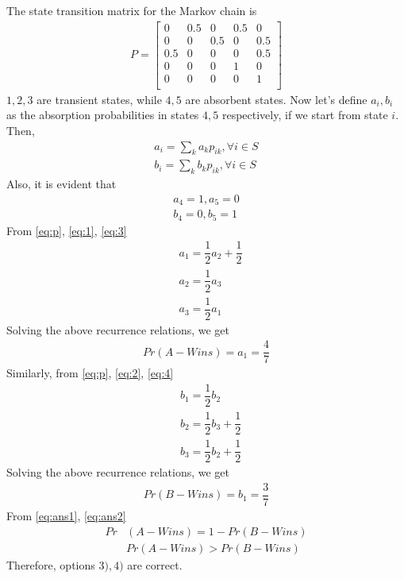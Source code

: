 \documentclass[journal,12pt,twocolumn]{IEEEtran}
\begin{document}
The state transition matrix for the Markov chain is
\begin{align}
\tag{104.2}
\label{eq:p}
    P=\begin{bmatrix}
0 & 0.5 & 0 & 0.5 & 0 \\
0 & 0 & 0.5 & 0 & 0.5 \\
0.5 & 0 & 0 & 0 & 0.5 \\
0 & 0 & 0 & 1 & 0 \\
0 & 0 & 0 & 0 & 1 \\
\end{bmatrix}
\end{align}
$1,2,3$ are transient states, while $4,5$ are absorbent states. Now let's define $a_{i},b_{i}$ as the absorption probabilities in states $4,5$ respectively, if we start from state $i$. Then,
\begin{align}
\tag{104.3}
\label{eq:1}
    a_{i}=\displaystyle\sum_{k}a_{k}p_{ik}, \forall i\in S\\
\tag{104.4}
\label{eq:2}
    b_{i}=\displaystyle\sum_{k}b_{k}p_{ik}, \forall i\in S   
\end{align}
Also, it is evident that
\begin{align}
\tag{104.5}
\label{eq:3}
    a_{4}=1, a_{5}=0\\
\tag{104.6}
\label{eq:4}
    b_{4}=0, b_{5}=1
\end{align}
From \eqref{eq:p}, \eqref{eq:1}, \eqref{eq:3}
\begin{align}
\tag{104.7}
    &a_{1}= \dfrac{1}{2}a_{2}+\dfrac{1}{2}\\
\tag{104.8}
    &a_{2}= \dfrac{1}{2}a_{3}\\ 
\tag{104.9}
    &a_{3}= \dfrac{1}{2}a_{1}
\end{align}
Solving the above recurrence relations, we get 
\begin{align}
\tag{104.10}
\label{eq:ans1}
    Pr(A-Wins)=a_{1}=\dfrac{4}{7}
\end{align}
Similarly, from \eqref{eq:p}, \eqref{eq:2}, \eqref{eq:4}
\begin{align}
\tag{104.11}
    &b_{1}= \dfrac{1}{2}b_{2}\\
\tag{104.12}
    &b_{2}= \dfrac{1}{2}b_{3}+\dfrac{1}{2}\\ 
\tag{104.13}
    &b_{3}= \dfrac{1}{2}b_{2}+\dfrac{1}{2}
\end{align}
Solving the above recurrence relations, we get 
\begin{align}
\tag{104.14}
\label{eq:ans2}
    Pr(B-Wins)=b_{1}=\dfrac{3}{7}
\end{align}
From \eqref{eq:ans1}, \eqref{eq:ans2}
\begin{align}
\tag{104.15}
    Pr&(A-Wins)=1-Pr(B-Wins)\\
\tag{104.16}
    &Pr(A-Wins) > Pr(B-Wins)    
\end{align}
Therefore, options $3),4)$ are correct.
\end{document}
